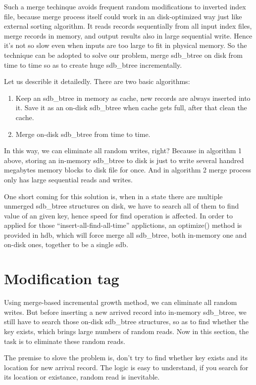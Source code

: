 \documentclass[a4paper,10pt]{article}
\begin{document}
Such a merge techinque avoids frequent random modifications to inverted index file, because merge process itself could work in an disk-optimized way just like external sorting algorithm.
It reads records sequentially from all input index files, merge records in memory, and output results also in large sequential write. Hence it's not so slow even when inputs are too large to fit in physical memory.
So the technique can be adopted to solve our problem, merge sdb\_btree on disk from time to time so as to create huge sdb\_btree incrementally.

Let us describle it detailedly. There are two basic algorithms:
\begin{enumerate}
\item Keep an sdb\_btree in memory as cache, new records are always inserted into it. Save it as an on-disk sdb\_btree when cache gets full, after that clean the cache.
\item Merge on-disk sdb\_btree from time to time.
\end{enumerate}

In this way, we can eliminate all random writes, right? Because in algorithm 1 above, storing an in-memory sdb\_btree to disk is just to write several handred megabytes memory blocks to disk file for once.
And in algorithm 2 merge process only has large sequential reads and writes.

One short coming for this solution is, when in a state there are multiple unmerged sdb\_btree structures on disk, we have to search all of them to find value of an given key, hence speed for find operation is affected.
In order to applied for those ``insert-all-find-all-time'' applictions, an optimize() method is provided in hdb, which will force merge all sdb\_btree, both in-memory one and on-disk ones, together to be a single sdb.

\section{Modification tag}

Using merge-based incremental growth method, we can eliminate all random writes. But before inserting a new arrived record into in-memory sdb\_btree,
we still have to search those on-disk sdb\_btree structures, so as to find whether the key exists, which brings large numbers of random reads.
Now in this section, the task is to eliminate these random reads.

The premise to slove the problem is, don't try to find whether key exists and its location for new arrival record. The logic is easy to understand, if you search for its location or existance, random read is inevitable.
\end{document}
